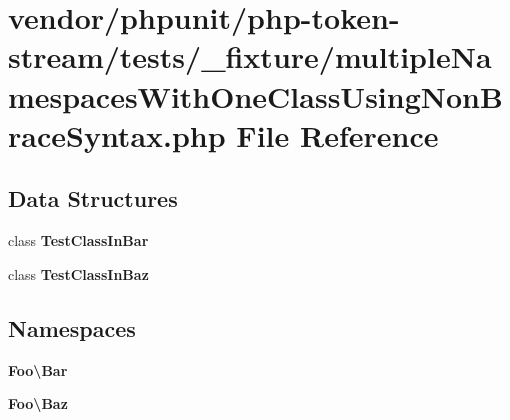 \section{vendor/phpunit/php-\/token-\/stream/tests/\+\_\+fixture/multiple\+Namespaces\+With\+One\+Class\+Using\+Non\+Brace\+Syntax.php File Reference}
\label{multiple_namespaces_with_one_class_using_non_brace_syntax_8php}
\subsection*{Data Structures}
\begin{DoxyCompactItemize}
\item 
class {\bf Test\+Class\+In\+Bar}
\item 
class {\bf Test\+Class\+In\+Baz}
\end{DoxyCompactItemize}
\subsection*{Namespaces}
\begin{DoxyCompactItemize}
\item 
 {\bf Foo\textbackslash{}\+Bar}
\item 
 {\bf Foo\textbackslash{}\+Baz}
\end{DoxyCompactItemize}
